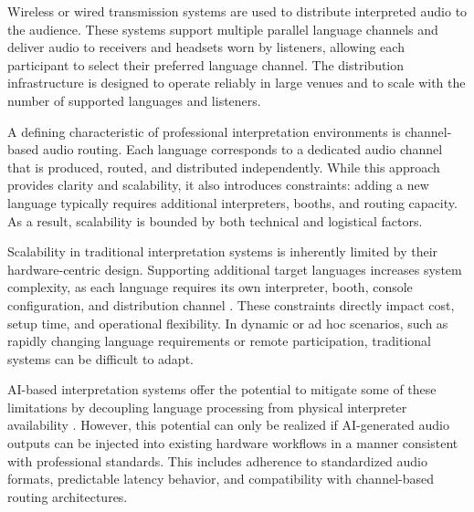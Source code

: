 Wireless or wired transmission systems are used to distribute interpreted audio to the audience. These systems support multiple parallel language channels and deliver audio to receivers and headsets worn by listeners, allowing each participant to select their preferred language channel. The distribution infrastructure is designed to operate reliably in large venues and to scale with the number of supported languages and listeners.

A defining characteristic of professional interpretation environments is channel-based audio routing. Each language corresponds to a dedicated audio channel that is produced, routed, and distributed independently. While this approach provides clarity and scalability, it also introduces constraints: adding a new language typically requires additional interpreters, booths, and routing capacity. As a result, scalability is bounded by both technical and logistical factors.


Scalability in traditional interpretation systems is inherently limited by their hardware-centric design. Supporting additional target languages increases system complexity, as each language requires its own interpreter, booth, console configuration, and distribution channel \cite{conference_interpreting_new_tech}. These constraints directly impact cost, setup time, and operational flexibility. In dynamic or ad hoc scenarios, such as rapidly changing language requirements or remote participation, traditional systems can be difficult to adapt.

AI-based interpretation systems offer the potential to mitigate some of these limitations by decoupling language processing from physical interpreter availability \cite{ahmed2022technology, ozkaya2023transformative}. However, this potential can only be realized if AI-generated audio outputs can be injected into existing hardware workflows in a manner consistent with professional standards. This includes adherence to standardized audio formats, predictable latency behavior, and compatibility with channel-based routing architectures.


